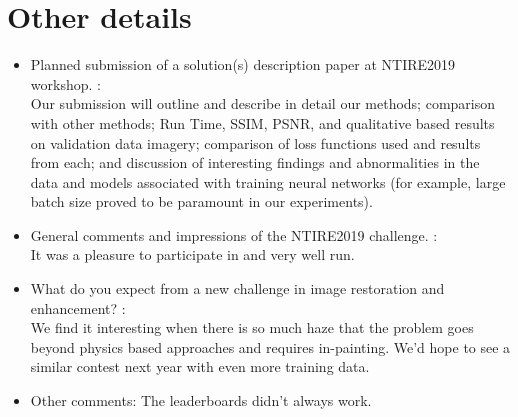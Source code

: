 \documentclass[12pt]{article}
\begin{document}
\section{Other details}
\begin{itemize}
\item Planned submission of a solution(s) description paper at NTIRE2019 workshop. :\\
Our submission will outline and describe in detail our methods; comparison with other methods; Run Time, SSIM, PSNR, and qualitative based results on validation data imagery; comparison of loss functions used and results from each; and discussion of interesting findings and abnormalities in the data and models associated with training neural networks (for example, large batch size proved to be paramount in our experiments).

\item General comments and impressions of the NTIRE2019 challenge. : \\
It was a pleasure to participate in and very well run. 
\item What do you expect from a new challenge in image restoration and enhancement? :\\
We find it interesting when there is so much haze that the problem goes beyond physics based approaches and requires in-painting. We'd hope to see a similar contest next year with even more training data. 
\item Other comments: The leaderboards didn't always work. 
\end{itemize}
\end{document}
